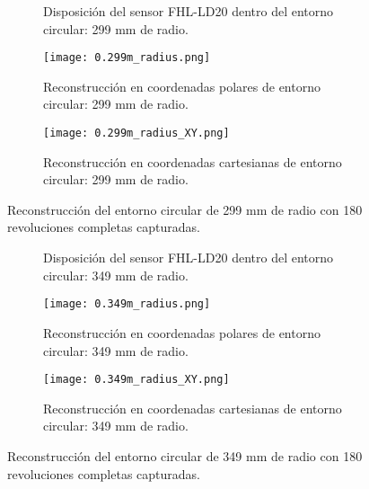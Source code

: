 \begin{figure}[H]
	\centering
	\begin{subfigure}{\textwidth}
		\centering
		\caption{Disposición del sensor FHL-LD20 dentro del entorno circular: 299 mm de radio.}
		\label{fig:disposicion_lidar_var4}
		\vspace{1em}
	\end{subfigure}
	\begin{subfigure}{0.45\textwidth}
		\centering
		\texttt{[image: 0.299m\_radius.png]}
		\caption{Reconstrucción en coordenadas polares de entorno circular: 299 mm de radio.}
		\label{fig:299m_radius_xy}
	\end{subfigure}
	\hspace{1em}
	\begin{subfigure}{0.45\textwidth}
		\centering
		\texttt{[image: 0.299m\_radius\_XY.png]}
		\caption{Reconstrucción en coordenadas cartesianas de entorno circular: 299 mm de radio.}
		\label{fig:299m_radius}
	\end{subfigure}
	\caption{Reconstrucción del entorno circular de 299 mm de radio con 180 revoluciones completas capturadas.}
	\label{fig:disposicion_lidar_var_dist4}
\end{figure}

\begin{figure}[H]
	\centering
	\begin{subfigure}{\textwidth}
		\centering
		\caption{Disposición del sensor FHL-LD20 dentro del entorno circular: 349 mm de radio.}
		\label{fig:disposicion_lidar_var5}
		\vspace{1em}
	\end{subfigure}
	\begin{subfigure}{0.45\textwidth}
		\centering
		\texttt{[image: 0.349m\_radius.png]}
		\caption{Reconstrucción en coordenadas polares de entorno circular: 349 mm de radio.}
		\label{fig:349m_radius_xy}
	\end{subfigure}
	\hspace{1em}
	\begin{subfigure}{0.45\textwidth}
		\centering
		\texttt{[image: 0.349m\_radius\_XY.png]}
		\caption{Reconstrucción en coordenadas cartesianas de entorno circular: 349 mm de radio.}
		\label{fig:349m_radius}
	\end{subfigure}
	\caption{Reconstrucción del entorno circular de 349 mm de radio con 180 revoluciones completas capturadas.}
	\label{fig:disposicion_lidar_var_dist5}
\end{figure}

